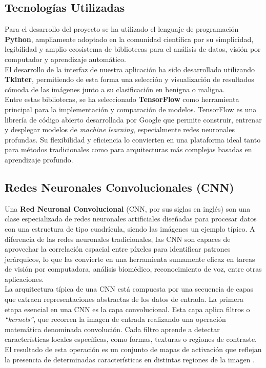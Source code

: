 \documentclass[12pt]{article} %
\begin{document}
\subsection{Tecnologías Utilizadas}
Para el desarrollo del proyecto se ha utilizado el lenguaje de programación \textbf{Python}\cite{python_org}, ampliamente adoptado en la comunidad científica por su simplicidad, legibilidad y amplio ecosistema de bibliotecas para el análisis de datos, visión por computador y aprendizaje automático.\\

El desarrollo de la interfaz de nuestra aplicación ha sido desarrollado utilizando \textbf{Tkinter}\cite{python_tkinter}, permitiendo de esta forma una selección y visualización de resultados cómoda de las imágenes junto a su clasificación en benigna o maligna.\\

Entre estas bibliotecas, se ha seleccionado \textbf{TensorFlow}\cite{tensorflow_org} como herramienta principal para la implementación y comparación de modelos. TensorFlow es una librería de código abierto desarrollada por Google que permite construir, entrenar y desplegar modelos de \textit{machine learning}, especialmente redes neuronales profundas. Su flexibilidad y eficiencia lo convierten en una plataforma ideal tanto para métodos tradicionales como para arquitecturas más complejas basadas en aprendizaje profundo.\\

\subsection{Redes Neuronales Convolucionales (CNN)}
Una \textbf{Red Neuronal Convolucional} (CNN, por sus siglas en inglés) son una clase especializada de redes neuronales artificiales diseñadas para procesar datos con una estructura de tipo cuadrícula, siendo las imágenes un ejemplo típico. A diferencia de las redes neuronales tradicionales, las CNN son capaces de aprovechar la correlación espacial entre píxeles para identificar patrones jerárquicos, lo que las convierte en una herramienta sumamente eficaz en tareas de visión por computadora, análisis biomédico, reconocimiento de voz, entre otras aplicaciones.\\

La arquitectura típica de una CNN está compuesta por una secuencia de capas que extraen representaciones abstractas de los datos de entrada. La primera etapa esencial en una CNN es la capa convolucional. Esta capa aplica filtros o \textit{“kernels”}, que recorren la imagen de entrada realizando una operación matemática denominada convolución. Cada filtro aprende a detectar características locales específicas, como formas, texturas o regiones de contraste. El resultado de esta operación es un conjunto de mapas de activación que reflejan la presencia de determinadas características en distintas regiones de la imagen \cite{lecun1998gradient}. \\
\end{document}
